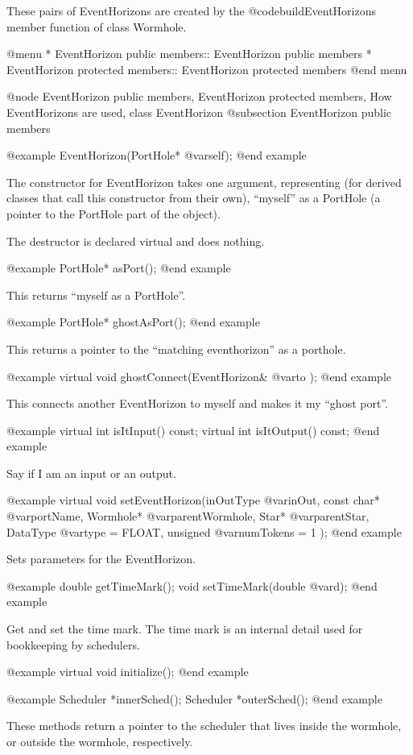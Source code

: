 These pairs of EventHorizons are created by the
@code{buildEventHorizons} member function of class Wormhole.

@menu
* EventHorizon public members::  EventHorizon public members
* EventHorizon protected members::  EventHorizon protected members
@end menu

@node EventHorizon public members, EventHorizon protected members, How EventHorizons are used, class EventHorizon
@subsection EventHorizon public members

@example
EventHorizon(PortHole* @var{self});
@end example

The constructor for EventHorizon takes one argument, representing (for
derived classes that call this constructor from their own), ``myself'' as
a PortHole (a pointer to the PortHole part of the object).

The destructor is declared virtual and does nothing.

@example
PortHole* asPort();
@end example

This returns ``myself as a PortHole''.

@example
PortHole* ghostAsPort();
@end example

This returns a pointer to the ``matching eventhorizon'' as a porthole.

@example
virtual void ghostConnect(EventHorizon& @var{to} );
@end example

This connects another EventHorizon to myself and makes it my ``ghost
port''.

@example
virtual int isItInput() const;
virtual int isItOutput() const;
@end example

Say if I am an input or an output.

@example
virtual void setEventHorizon(inOutType @var{inOut}, const char* @var{portName},
     Wormhole* @var{parentWormhole}, Star* @var{parentStar},
     DataType @var{type} = FLOAT, unsigned @var{numTokens} = 1 );
@end example

Sets parameters for the EventHorizon.

@example
double getTimeMark();
void setTimeMark(double @var{d});
@end example

Get and set the time mark.  The time mark is an internal detail used for
bookkeeping by schedulers.

@example
virtual void initialize();
@end example

@example
Scheduler *innerSched();
Scheduler *outerSched();
@end example

These methods return a pointer to the scheduler that lives inside the
wormhole, or outside the wormhole, respectively.

